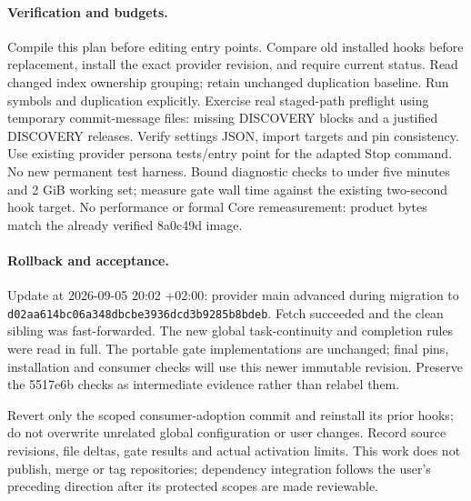 \documentclass[11pt,a4paper]{article}
\begin{document}
\paragraph{Verification and budgets.}
Compile this plan before editing entry points. Compare old installed hooks before
replacement, install the exact provider revision, and require current status.
Read changed index ownership grouping; retain unchanged duplication baseline.
Run symbols and duplication explicitly. Exercise real staged-path preflight
using temporary commit-message files: missing DISCOVERY blocks and a justified
DISCOVERY releases. Verify settings JSON, import targets and pin consistency.
Use existing provider persona tests/entry point for the adapted Stop command.
No new permanent test harness. Bound diagnostic checks to under five minutes
and 2 GiB working set; measure gate wall time against the existing two-second
hook target. No performance or formal Core remeasurement: product bytes match
the already verified 8a0c49d image.
\paragraph{Rollback and acceptance.}
Update at 2026-09-05 20:02 +02:00: provider main advanced during migration to
\texttt{d02aa614bc06a348dbcbe3936dcd3b9285b8bdeb}. Fetch succeeded and the clean
sibling was fast-forwarded. The new global task-continuity and completion rules
were read in full. The portable gate implementations are unchanged; final pins,
installation and consumer checks will use this newer immutable revision. Preserve
the 5517e6b checks as intermediate evidence rather than relabel them.

Revert only the scoped consumer-adoption commit and reinstall its prior hooks;
do not overwrite unrelated global configuration or user changes. Record source
revisions, file deltas, gate results and actual activation limits. This work does
not publish, merge or tag repositories; dependency integration follows the
user's preceding direction after its protected scopes are made reviewable.

\end{document}
